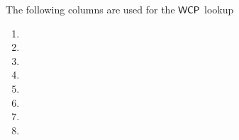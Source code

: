 The following columns are used for the $\textsf{WCP}$ lookup
\begin{multicols}{2}
      \begin{enumerate}[resume]
            \item \wcpFlag
            \item \wcpArgOneHi
            \item \wcpArgOneLo
            \item \wcpArgTwoHi
            \item \wcpArgTwoLo
            \item \wcpRes
            \item \wcpInst
            \item[\vspace{\fill}]
      \end{enumerate}
\end{multicols}

     
      
     